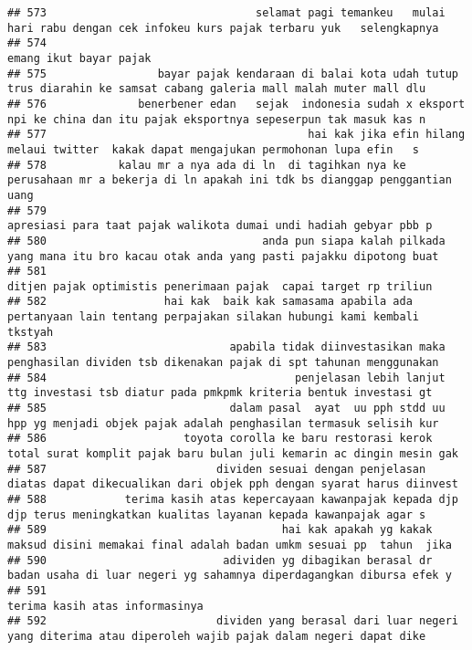 \documentclass[
]{article}
\begin{document}
\begin{verbatim}
## 573                                selamat pagi temankeu   mulai hari rabu dengan cek infokeu kurs pajak terbaru yuk   selengkapnya 
## 574                                                                                                           emang ikut bayar pajak
## 575                 bayar pajak kendaraan di balai kota udah tutup trus diarahin ke samsat cabang galeria mall malah muter mall dlu 
## 576              benerbener edan   sejak  indonesia sudah x eksport npi ke china dan itu pajak eksportnya sepeserpun tak masuk kas n
## 577                                        hai kak jika efin hilang melaui twitter  kakak dapat mengajukan permohonan lupa efin   s 
## 578           kalau mr a nya ada di ln  di tagihkan nya ke perusahaan mr a bekerja di ln apakah ini tdk bs dianggap penggantian uang
## 579                                                               apresiasi para taat pajak walikota dumai undi hadiah gebyar pbb p 
## 580                                 anda pun siapa kalah pilkada yang mana itu bro kacau otak anda yang pasti pajakku dipotong buat 
## 581                                                               ditjen pajak optimistis penerimaan pajak  capai target rp triliun 
## 582                  hai kak  baik kak samasama apabila ada pertanyaan lain tentang perpajakan silakan hubungi kami kembali  tkstyah
## 583                            apabila tidak diinvestasikan maka penghasilan dividen tsb dikenakan pajak di spt tahunan menggunakan 
## 584                                      penjelasan lebih lanjut ttg investasi tsb diatur pada pmkpmk kriteria bentuk investasi gt  
## 585                            dalam pasal  ayat  uu pph stdd uu hpp yg menjadi objek pajak adalah penghasilan termasuk selisih kur 
## 586                     toyota corolla ke baru restorasi kerok total surat komplit pajak baru bulan juli kemarin ac dingin mesin gak
## 587                          dividen sesuai dengan penjelasan diatas dapat dikecualikan dari objek pph dengan syarat harus diinvest 
## 588            terima kasih atas kepercayaan kawanpajak kepada djp  djp terus meningkatkan kualitas layanan kepada kawanpajak agar s
## 589                                    hai kak apakah yg kakak maksud disini memakai final adalah badan umkm sesuai pp  tahun  jika 
## 590                           adividen yg dibagikan berasal dr badan usaha di luar negeri yg sahamnya diperdagangkan dibursa efek y 
## 591                                                                                                   terima kasih atas informasinya
## 592                          dividen yang berasal dari luar negeri yang diterima atau diperoleh wajib pajak dalam negeri dapat dike 

\end{verbatim}
\end{document}

